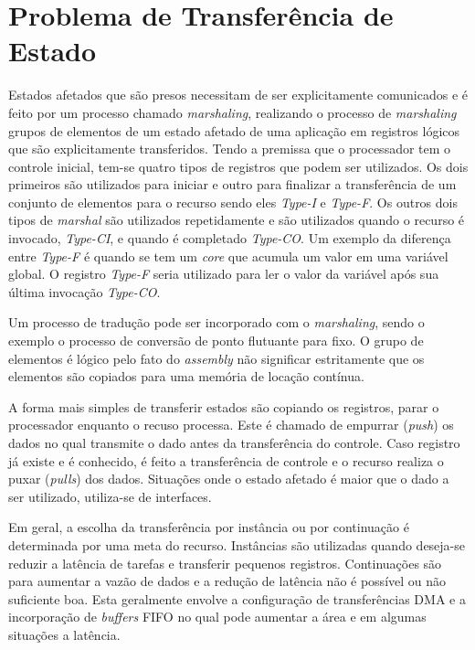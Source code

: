 \section{Problema de Transferência de Estado}
Estados afetados que são presos necessitam de ser explicitamente comunicados e é feito por um processo chamado \textit{marshaling}, realizando o processo de \textit{marshaling} grupos de elementos de um estado afetado de uma aplicação em registros lógicos que são explicitamente transferidos. Tendo a premissa que o processador tem o controle inicial, tem-se quatro tipos de registros que podem ser utilizados. Os dois primeiros são utilizados para iniciar e outro para finalizar a transferência de um conjunto de elementos para o recurso sendo eles \textit{Type-I} e \textit{Type-F}. Os outros dois tipos de \textit{marshal} são utilizados repetidamente e são utilizados quando o recurso é invocado, \textit{Type-CI}, e quando é completado \textit{Type-CO}. Um exemplo da diferença entre \textit{Type-F} é quando se tem um \textit{core} que acumula um valor em uma variável global. O registro \textit{Type-F} seria utilizado para ler o valor da variável após sua última invocação \textit{Type-CO}.

Um processo de tradução pode ser incorporado com o \textit{marshaling}, sendo o exemplo o processo de conversão de ponto flutuante para fixo. O grupo de elementos é lógico pelo fato do \textit{assembly} não significar estritamente que os elementos são copiados para uma memória de locação contínua. 

A forma mais simples de transferir estados são copiando os registros, parar o processador enquanto o recuso processa. Este é chamado de empurrar (\textit{push}) os dados no qual transmite o dado antes da transferência do controle. Caso registro já existe e é conhecido, é feito a transferência de controle e o recurso realiza o puxar (\textit{pulls}) dos dados. Situações onde o estado afetado é maior que o dado a ser utilizado, utiliza-se de interfaces.

Em geral, a escolha da transferência por instância ou por continuação é determinada por uma meta do recurso. Instâncias são utilizadas quando deseja-se reduzir a latência de tarefas e transferir pequenos registros. Continuações são para aumentar a vazão de dados e a redução de latência não é possível ou não suficiente boa. Esta geralmente envolve a configuração de transferências DMA e a incorporação de \textit{buffers} FIFO no qual pode aumentar a área e em algumas situações a latência.

